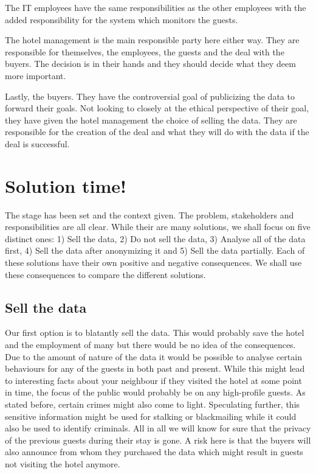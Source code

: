 The IT employees have the same responsibilities as the other employees with the added responsibility for the system which monitors the guests.

The hotel management is the main responsible party here either way. They are responsible for themselves, the employees, the guests and the deal with the buyers. The decision is in their hands and they should decide what they deem more important.

Lastly, the buyers. They have the controversial goal of publicizing the data to forward their goals. Not looking to closely at the ethical perspective of their goal, they have given the hotel management the choice of selling the data. They are responsible for the creation of the deal and what they will do with the data if the deal is successful.
  
\section{Solution time!}
The stage has been set and the context given. The problem, stakeholders and responsibilities are all clear. While their are many solutions, we shall focus on five distinct ones: 1) Sell the data, 2) Do not sell the data, 3) Analyse all of the data first, 4) Sell the data after anonymizing it and 5) Sell the data partially. Each of these solutions have their own positive and negative consequences. We shall use these consequences to compare the different solutions.  

\subsection{Sell the data}
Our first option is to blatantly sell the data. This would probably save the hotel and the employment of many but there would be no idea of the consequences. Due to the amount of nature of the data it would be possible to analyse certain behaviours for any of the guests in both past and present. While this might lead to interesting facts about your neighbour if they visited the hotel at some point in time, the focus of the public would probably be on any high-profile guests. As stated before, certain crimes might also come to light. Speculating further, this sensitive information might be used for stalking or blackmailing while it could also be used to identify criminals. All in all we will know for sure that the privacy of the previous guests during their stay is gone. A risk here is that the buyers will also announce from whom they purchased the data which might result in guests not visiting the hotel anymore.

